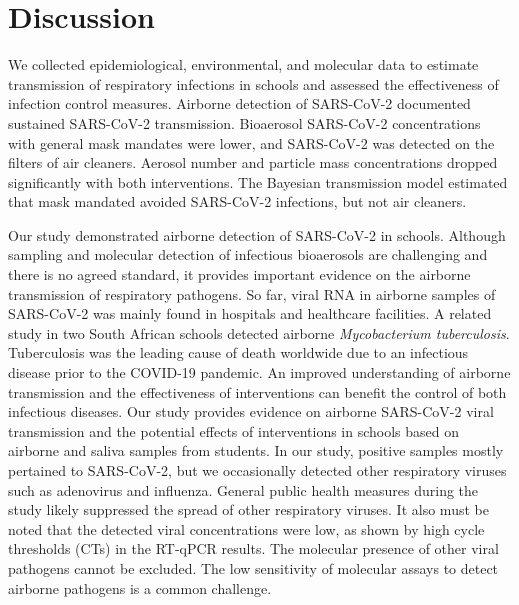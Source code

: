\documentclass[fleqn,11pt]{wlscirep}
\begin{document}
{\FloatBarrier

\newpage

\section{Discussion}

We collected epidemiological, environmental, and molecular data to estimate transmission of respiratory infections in schools and assessed the effectiveness of infection control measures. Airborne detection of SARS-CoV-2 documented sustained SARS-CoV-2 transmission. Bioaerosol SARS-CoV-2 concentrations with general mask mandates were lower, and SARS-CoV-2 was detected on the filters of air cleaners. Aerosol number and particle mass concentrations dropped significantly with both interventions. The Bayesian transmission model estimated that mask mandated avoided SARS-CoV-2 infections, but not air cleaners.

Our study demonstrated airborne detection of SARS-CoV-2 in schools. Although sampling and molecular detection of infectious bioaerosols are challenging and there is no agreed standard\cite{Santarpia2020,Morris2022,Stockwell2019}, it provides important evidence on the airborne transmission of respiratory pathogens. So far, viral RNA in airborne samples of SARS-CoV-2 was mainly found in hospitals and healthcare facilities\cite{Shen2021}. A related study in two South African schools detected airborne \emph{Mycobacterium tuberculosis}\cite{Bunyasi2022}. Tuberculosis was the leading cause of death worldwide due to an infectious disease prior to the COVID-19 pandemic. An improved understanding of airborne transmission and the effectiveness of interventions can benefit the control of both infectious diseases\cite{Rieder2021}. Our study provides evidence on airborne SARS-CoV-2 viral transmission and the potential effects of interventions in schools based on airborne and saliva samples from students. In our study, positive samples mostly pertained to SARS-CoV-2, but we occasionally detected other respiratory viruses such as adenovirus and influenza. General public health measures during the study likely suppressed the spread of other respiratory viruses. It also must be noted that the detected viral concentrations were low, as shown by high cycle thresholds (CTs) in the RT-qPCR results. The molecular presence of other viral pathogens cannot be excluded. The low sensitivity of molecular assays to detect airborne pathogens is a common challenge\cite{Morris2022,Stockwell2019}.

}
\end{document}
